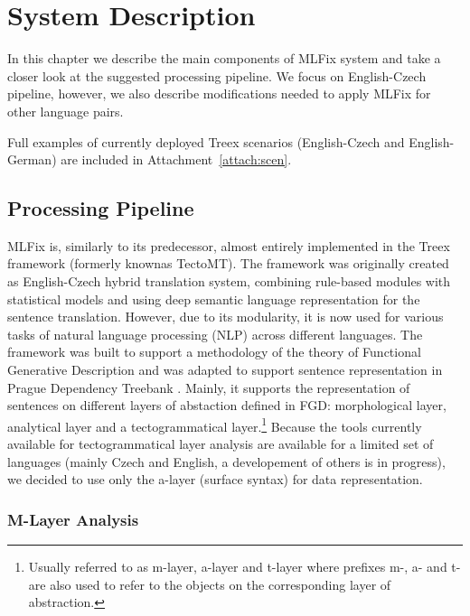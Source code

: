 \chapter{System Description}
\label{chap:system_descr}

In this chapter we describe the main components
of MLFix system and take a closer look at the suggested processing pipeline.
We focus on English-Czech pipeline, however, we also describe modifications
needed to apply MLFix for other language pairs.

Full examples of currently deployed Treex scenarios (English-Czech and English-German)
are included in Attachment~\ref{attach:scen}.


\section{Processing Pipeline}

MLFix is, similarly to its predecessor, almost entirely implemented in the
Treex \citep{Popel:2010:TMN:1884371.1884406}
framework (formerly knownas TectoMT).
The framework was originally created as English-Czech hybrid translation system, combining
rule-based modules with statistical models and using deep semantic language representation
for the sentence translation. However, due to its modularity, it is
now used for various tasks of natural language processing (NLP) across different
languages. The framework was built to support a methodology of the theory of Functional Generative Description \citep{Sgall1967}
and was adapted to support sentence representation in Prague Dependency Treebank \citep{pdt20:2006}.
Mainly, it supports the representation of sentences on different layers of abstaction defined in FGD: morphological layer,
analytical layer and a tectogrammatical layer.\footnote{Usually referred to as m-layer, a-layer and t-layer where prefixes m-, a- and t- are also used to refer to the objects on the corresponding layer of abstraction.}
Because the tools currently available for tectogrammatical layer analysis are available for
a limited set of languages (mainly Czech and English, a developement of others is in progress),
we decided to use only the a-layer (surface syntax) for data representation.

\subsection{M-Layer Analysis}

